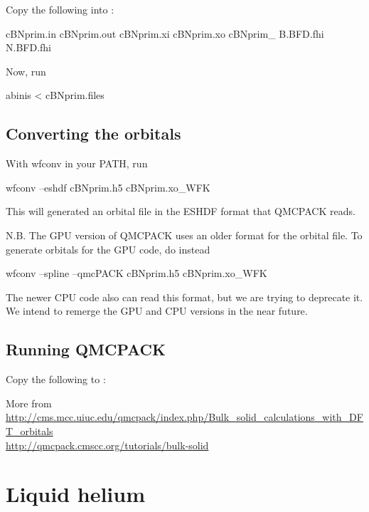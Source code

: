 Copy the following into :
\begin{code}
cBNprim.in
cBNprim.out
cBNprim.xi
cBNprim.xo
cBNprim_
B.BFD.fhi
N.BFD.fhi
\end{code}

Now, run
\begin{term}
abinis < cBNprim.files
\end{term}

\subsection*{Converting the orbitals}
With wfconv in your PATH, run
\begin{term}
wfconv --eshdf cBNprim.h5 cBNprim.xo_WFK
\end{term}

This will generated an orbital file in the ESHDF format that QMCPACK reads.

N.B. The GPU version of QMCPACK uses an older format for the orbital file. To generate orbitals for the GPU code, do instead
\begin{term}
wfconv --spline --qmcPACK cBNprim.h5 cBNprim.xo_WFK
\end{term}

The newer CPU code also can read this format, but we are trying to deprecate it. We intend to remerge the GPU and CPU versions in the near future. 

\subsection*{Running QMCPACK}
Copy the following to :

More from\\
\url{http://cms.mcc.uiuc.edu/qmcpack/index.php/Bulk_solid_calculations_with_DFT_orbitals}\\
\url{http://qmcpack.cmscc.org/tutorials/bulk-solid}
\section{Liquid helium}

